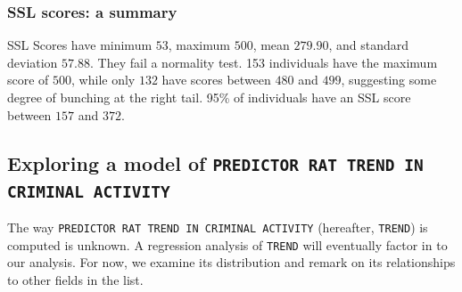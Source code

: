 \subsubsection{SSL scores: a summary}
SSL Scores have minimum $53$, maximum $500$, mean $279.90$, and standard deviation $57.88$. They fail a normality test. 153 individuals have the maximum score of $500$, while only $132$ have scores between $480$ and $499$, suggesting some degree of bunching at the right tail. 95\% of individuals have an SSL score between $157$ and $372$.

\subsection{Exploring a model of \texttt{PREDICTOR RAT TREND IN CRIMINAL ACTIVITY}}
The way \texttt{PREDICTOR RAT TREND IN CRIMINAL ACTIVITY} (hereafter, \texttt{TREND}) is computed is unknown. A regression analysis of \texttt{TREND} will eventually factor in to our analysis. For now, we examine its distribution and remark on its relationships to other fields in the list.

